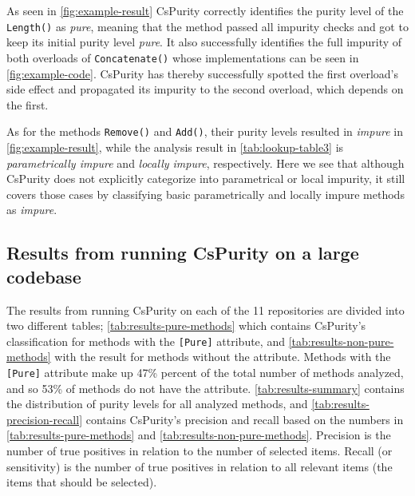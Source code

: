\documentclass[a4paper,12pt]{article}
\begin{document}
As seen in \autoref{fig:example-result} CsPurity correctly identifies the purity level of the \texttt{Length()} as \textit{pure}, meaning that the method passed all impurity checks and got to keep its initial purity level \textit{pure}. It also successfully identifies the full impurity of both overloads of \texttt{Concatenate()} whose implementations can be seen in \autoref{fig:example-code}. CsPurity has thereby successfully spotted the first overload's side effect and propagated its impurity to the second overload, which depends on the first.

As for the methods \texttt{Remove()} and \texttt{Add()}, their purity levels resulted in \textit{impure} in \autoref{fig:example-result}, while the analysis result in \autoref{tab:lookup-table3} is \textit{parametrically impure} and \textit{locally impure}, respectively. Here we see that although CsPurity does not explicitly categorize into parametrical or local impurity, it still covers those cases by classifying basic parametrically and locally impure methods as \textit{impure}.

\subsection{Results from running CsPurity on a large codebase} \label{sub:results-larger-codebase}

The results from running CsPurity on each of the 11 repositories are divided into two different tables; \autoref{tab:results-pure-methods} which contains CsPurity's classification for methods with the \texttt{[Pure]} attribute, and \autoref{tab:results-non-pure-methods} with the result for methods without the attribute. Methods with the \texttt{[Pure]} attribute make up 47\% percent of the total number of methods analyzed, and so 53\% of methods do not have the attribute. \autoref{tab:results-summary} contains the distribution of purity levels for all analyzed methods, and \autoref{tab:results-precision-recall} contains CsPurity's precision and recall based on the numbers in \autoref{tab:results-pure-methods} and \autoref{tab:results-non-pure-methods}. Precision is the number of true positives in relation to the number of selected items. Recall (or sensitivity) is the number of true positives in relation to all relevant items (the items that should be selected).
\end{document}
